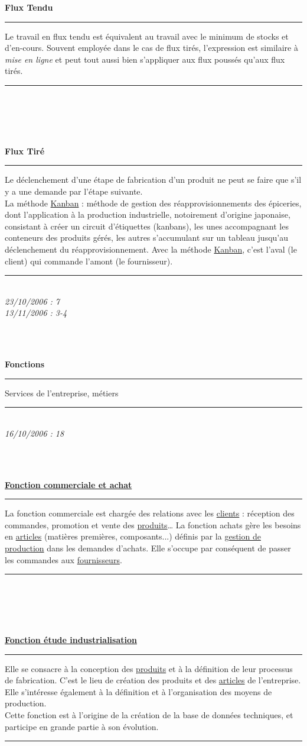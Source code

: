 \documentclass[12pt,a4paper,twoside]{article}
\newcommand{\definition}[3]{
	\begin{minipage}{\textwidth}
		\textbf{\large{#1}}\\
		\rule{\textwidth}{0.5pt}
		#2\\
		\ifthenelse{\isempty{#3}}%
	    {}%
	    {\rule{\textwidth}{0.25pt}\\\textit{#3}}%
    \end{minipage}
    \\\\
}
\begin{document}
\definition{Flux Tendu}
{
	Le travail en flux tendu est équivalent au travail avec le minimum de stocks et d'en-cours. Souvent employée dans le cas de flux tirés, l'expression est similaire à \textit{mise en ligne} et peut tout aussi bien s'appliquer aux flux poussés qu'aux flux tirés.
	}{}
	
\definition{Flux Tiré}
{
	Le déclenchement d'une étape de fabrication d'un produit ne peut se faire que s'il y a une demande par l'étape suivante.\\
La méthode \href{http://fr.wikipedia.org/wiki/Kanban}{Kanban} : méthode de gestion des réapprovisionnements des épiceries, dont l'application à la production industrielle, notoirement d'origine japonaise, consistant à créer un circuit d'étiquettes (kanbans), les unes accompagnant les conteneurs des produits gérés, les autres s'accumulant sur un tableau jusqu'au déclenchement du réapprovisionnement. Avec la méthode \href{http://fr.wikipedia.org/wiki/Kanban}{Kanban}, c'est l'aval (le client) qui commande l'amont (le fournisseur).
	}{23/10/2006 : 7\\13/11/2006 : 3-4}
	
\definition{Fonctions}
{
	Services de l'entreprise, métiers
	}{16/10/2006 : 18}
	
\definition{\href{http://gpr.insa-lyon.fr/supgedem/Home/Le_monde_industriel/L_entreprise/Le_commercial_achats/fonction_commerciale.htm}{Fonction commerciale et achat}}
{
	La fonction commerciale est chargée des relations avec les \href{http://gpr.insa-lyon.fr/supgedem/Home/glossaire/gLesclients.htm}{clients} : réception des commandes, promotion et vente des \href{http://gpr.insa-lyon.fr/supgedem/Home/glossaire/gLeproduit.htm}{produits}…
La fonction achats gère les besoins en \href{http://gpr.insa-lyon.fr/supgedem/Home/glossaire/garticle.htm}{articles} (matières premières, composants...) définis par la \href{http://gpr.insa-lyon.fr/supgedem/Home/glossaire/gLafonctiongestiondeproduction.htm}{gestion de production} dans les demandes d'achats. Elle s'occupe par conséquent de passer les commandes aux \href{http://gpr.insa-lyon.fr/supgedem/Home/glossaire/gLesfournisseurs.htm}{fournisseurs}.
	}{}
	
\definition{\href{http://gpr.insa-lyon.fr/supgedem/Home/Le_monde_industriel/L_entreprise/L_etude_industrialisation/fonction_etude_indus.htm}{Fonction étude industrialisation}}
{
	Elle se consacre à la conception des \href{http://gpr.insa-lyon.fr/supgedem/Home/Le_monde_industriel/L_entreprise/L_etude_industrialisation/leproduit.htm}{produits} et à la définition de leur processus de fabrication. C'est le lieu de création des produits et des \href{http://gpr.insa-lyon.fr/supgedem/Home/glossaire/garticle.htm}{articles} de l'entreprise. Elle s'intéresse également à la définition et à l'organisation des moyens de production.\\
Cette fonction est à l'origine de la création de la base de données techniques, et participe en grande partie à son évolution.
	}{}
	
\end{document}
